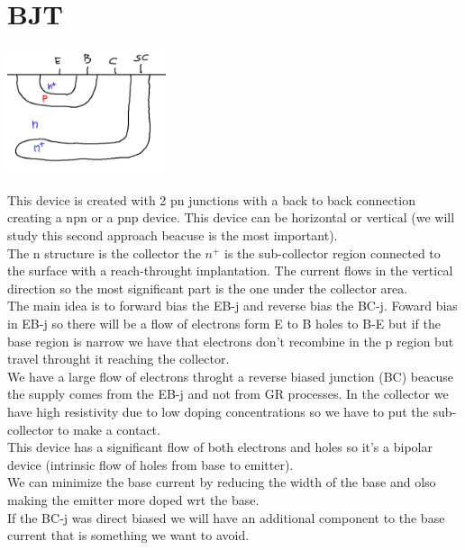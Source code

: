 \chapter{BJT}


\centering
\includegraphics[width=0.35\textwidth]{bjt1.png}\\
\raggedright

This device is created with 2 pn junctions with a back to back connection creating a npn or a pnp device. This device can be horizontal or vertical (we will study this second approach beacuse is the most important).\\
The n structure is the collector the $n^+$ is the sub-collector region connected to the surface with a reach-throught implantation. The current flows in the vertical direction so the most significant part is the one under the collector area.\\
The main idea is to forward bias the EB-j and reverse bias the BC-j. Foward bias in EB-j so there will be a flow of electrons form E to B holes to B-E but if the base region is narrow we have that electrons don't recombine in the p region but travel throught it reaching the collector.\\
We have a large flow of electrons throght a reverse biased junction (BC) beacuse the supply comes from the EB-j and not from GR processes. In the collector we have high resistivity due to low doping concentrations so we have to put the sub-collector to make a contact.\\
\vspace{5mm}
This device has a significant flow of both electrons and holes so it's a bipolar device (intrinsic flow of holes from base to emitter).\\
We can minimize the base current by reducing the width of the base and olso making the emitter more doped wrt the base.\\
\vspace{5mm}
If the BC-j was direct biased we will have an additional component to the base current that is something we want to avoid.\\

